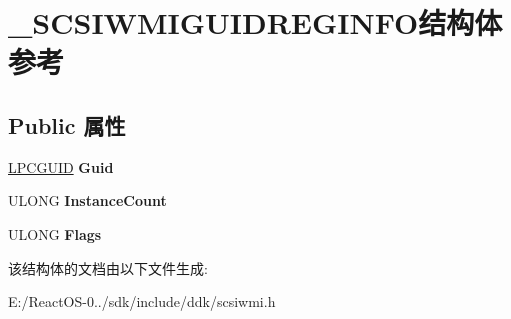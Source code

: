 \hypertarget{struct___s_c_s_i_w_m_i_g_u_i_d_r_e_g_i_n_f_o}{}\section{\+\_\+\+S\+C\+S\+I\+W\+M\+I\+G\+U\+I\+D\+R\+E\+G\+I\+N\+F\+O结构体 参考}
\label{struct___s_c_s_i_w_m_i_g_u_i_d_r_e_g_i_n_f_o}
\subsection*{Public 属性}
\begin{DoxyCompactItemize}
\item 
\mbox{\label{struct___s_c_s_i_w_m_i_g_u_i_d_r_e_g_i_n_f_o_a2a548fccf526bacb848d51db207a18ba}} 
\hyperlink{interface_g_u_i_d}{L\+P\+C\+G\+U\+ID} {\bfseries Guid}
\item 
\mbox{\label{struct___s_c_s_i_w_m_i_g_u_i_d_r_e_g_i_n_f_o_a429e641a8f6105f44c4c7a7be380487f}} 
U\+L\+O\+NG {\bfseries Instance\+Count}
\item 
\mbox{\label{struct___s_c_s_i_w_m_i_g_u_i_d_r_e_g_i_n_f_o_a804349b00ea8f3489a05f80c8df8e9d8}} 
U\+L\+O\+NG {\bfseries Flags}
\end{DoxyCompactItemize}


该结构体的文档由以下文件生成\+:\begin{DoxyCompactItemize}
\item 
E\+:/\+React\+O\+S-\/0../sdk/include/ddk/scsiwmi.\+h\end{DoxyCompactItemize}
